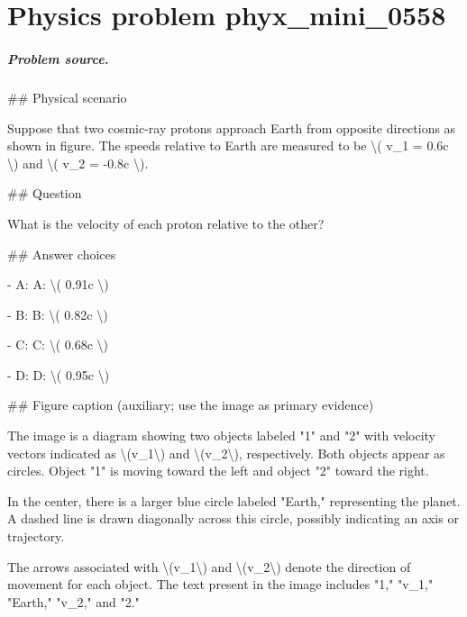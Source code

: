 
\chapter{Physics problem phyx\_mini\_0558}
\label{ch:PhyXMiniProblems_problem_phyx_mini_0558}

\paragraph{Problem source.}
\#\# Physical scenario

Suppose that two cosmic-ray protons approach Earth from opposite directions as shown in figure. The speeds relative to Earth are measured to be \textbackslash{}( v\_1 = 0.6c \textbackslash{}) and \textbackslash{}( v\_2 = -0.8c \textbackslash{}).

\#\# Question

What is the velocity of each proton relative to the other?

\#\# Answer choices

- A: A: \textbackslash{}( 0.91c \textbackslash{})

- B: B: \textbackslash{}( 0.82c \textbackslash{})

- C: C: \textbackslash{}( 0.68c \textbackslash{})

- D: D: \textbackslash{}( 0.95c \textbackslash{})

\#\# Figure caption (auxiliary; use the image as primary evidence)

The image is a diagram showing two objects labeled "1" and "2" with velocity vectors indicated as \textbackslash{}(v\_1\textbackslash{}) and \textbackslash{}(v\_2\textbackslash{}), respectively. Both objects appear as circles. Object "1" is moving toward the left and object "2" toward the right. 

In the center, there is a larger blue circle labeled "Earth," representing the planet. A dashed line is drawn diagonally across this circle, possibly indicating an axis or trajectory. 

The arrows associated with \textbackslash{}(v\_1\textbackslash{}) and \textbackslash{}(v\_2\textbackslash{}) denote the direction of movement for each object. The text present in the image includes "1," "v\_1," "Earth," "v\_2," and "2."

